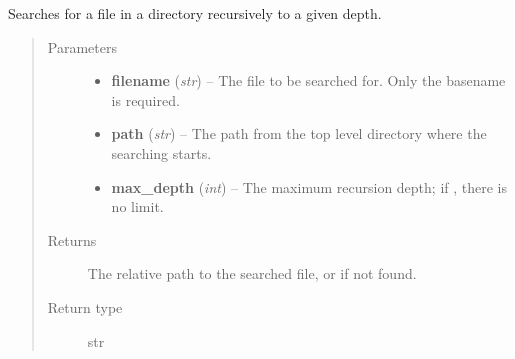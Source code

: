 \documentclass[a4paper,11pt,english]{sphinxmanual}
\begin{document}
\begin{fulllineitems}
\label{programming/utilities:jb_common.utils.base.find_file_in_directory}
Searches for a file in a directory recursively to a given depth.
\begin{quote}\begin{description}
\item[{Parameters}] \leavevmode\begin{itemize}
\item {} 
\textbf{filename} (\emph{str}) -- The file to be searched for.  Only the basename is
required.

\item {} 
\textbf{path} (\emph{str}) -- The path from the top level directory where the searching
starts.

\item {} 
\textbf{max\_depth} (\emph{int}) -- The maximum recursion depth; if , there is no
limit.

\end{itemize}

\item[{Returns}] \leavevmode
The relative path to the searched file, or  if not found.

\item[{Return type}] \leavevmode
str

\end{description}\end{quote}

\end{fulllineitems}

\end{document}
